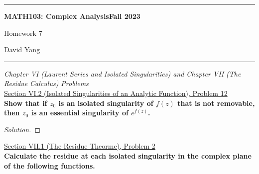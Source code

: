 \documentclass[11pt]{article}
\newenvironment{solution}
  {\renewcommand\qedsymbol{$\blacksquare$}\begin{proof}[Solution]}
  {\end{proof}}
\theoremstyle{definition}
\begin{document}
	\hrule
	\begin{center}
        \textbf{MATH103: Complex Analysis}\hfill \textbf{Fall 2023}\newline


		{\Large Homework 7}

		David Yang
	\end{center}

\hrule

\vspace{1em}


\textit{Chapter VI (Laurent Series and Isolated Singularities) and Chapter VII (The Residue Calculus) Problems} \\

\underline{Section VI.2 (Isolated Singularities of an Analytic Function), Problem 12}\\

\textbf{Show that if $z_0$ is an isolated singularity of $f(z)$ that is not removable, then $z_0$ is an essential singularity of $e^{f(z)}$.}

\begin{solution}

\end{solution}

\underline{Section VII.1 (The Residue Theorme), Problem 2}\\

\textbf{Calculate the residue at each isolated singularity in the complex plane of the following functions.}
\end{document}
